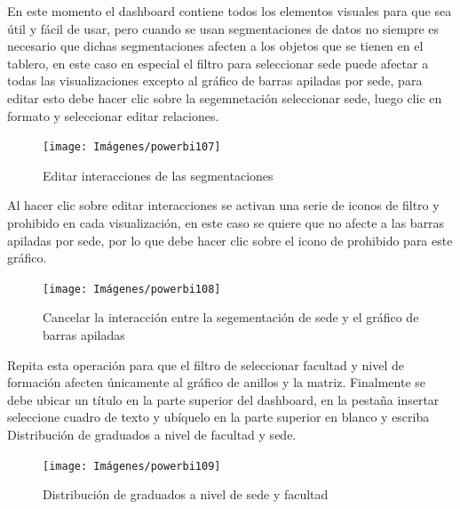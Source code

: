 \documentclass[
]{book}
\begin{document}
En este momento el dashboard contiene todos los elementos visuales para que sea útil y fácil de usar, pero cuando se usan segmentaciones de datos no siempre es necesario que dichas segmentaciones afecten a los objetos que se tienen en el tablero, en este caso en especial el filtro para seleccionar sede puede afectar a todas las visualizaciones excepto al gráfico de barras apiladas por sede, para editar esto debe hacer clic sobre la segemnetación seleccionar sede, luego clic en formato y seleccionar editar relaciones.

\begin{figure}

{\centering \texttt{[image: Imágenes/powerbi107]} 

}

\caption{Editar interacciones de las segmentaciones}\label{fig:editarinteracciones-fig}
\end{figure}

Al hacer clic sobre editar interacciones se activan una serie de iconos de filtro y prohibido en cada visualización, en este caso se quiere que no afecte a las barras apiladas por sede, por lo que debe hacer clic sobre el icono de prohibido para este gráfico.

\begin{figure}

{\centering \texttt{[image: Imágenes/powerbi108]} 

}

\caption{Cancelar la interacción entre la segementación de  sede y el gráfico de barras apiladas}\label{fig:editarinteraccionessedeybarrasapiladassede-fig}
\end{figure}

Repita esta operación para que el filtro de seleccionar facultad y nivel de formación afecten únicamente al gráfico de anillos y la matriz. Finalmente se debe ubicar un título en la parte superior del dashboard, en la pestaña insertar seleccione cuadro de texto y ubíquelo en la parte superior en blanco y escriba Distribución de graduados a nivel de facultad y sede.

\begin{figure}

{\centering \texttt{[image: Imágenes/powerbi109]} 

}

\caption{Distribución de graduados a nivel de sede y facultad}\label{fig:tablerodistribucuondegraduadossedeyfacultad-fig}
\end{figure}
\end{document}
